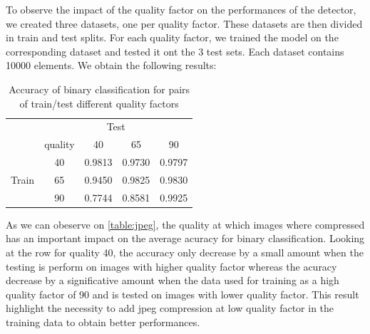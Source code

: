 \documentclass[12pt,a4paper]{article}
\begin{document}
To observe the impact of the quality factor on the performances of the detector, we created three datasets, one per quality factor. These datasets are then divided in train and test splits. For each quality factor, we trained the model on the corresponding dataset and tested it ont the 3 test sets. Each dataset contains 10000 elements. We obtain the following results:
\begin{table}[H]
    \centering
    \begin{tabular}{|c|c|c|c|c|}
    \hline
    & \multicolumn{4}{c|}{Test} \\
    \cline{2-5}
     & quality & 40 & 65 & 90 \\
    \hline
    \multirow{3}{*}{Train} & 40 & 0.9813 & 0.9730 & 0.9797 \\
     \cline{2-5}
     & 65 & 0.9450 & 0.9825 & 0.9830 \\
     \cline{2-5}
     & 90 & 0.7744 & 0.8581 & 0.9925 \\
    \hline
    \end{tabular}
    \caption{Accuracy of binary classification for pairs of train/test different quality factors}
    \label{table:jpeg}
\end{table}

As we can obeserve on \autoref*{table:jpeg}, the quality at which images where compressed has an important impact on the average acuracy for binary classification. Looking at the row for quality 40, the accuracy only decrease by a small amount when the testing is perform on images with higher quality factor whereas the acuracy decrease by a significative amount when the data used for training as a high quality factor of 90 and is tested on images with lower quality factor. This result highlight the necessity to add jpeg compression at low quality factor in the training data to obtain better performances.
\end{document}
